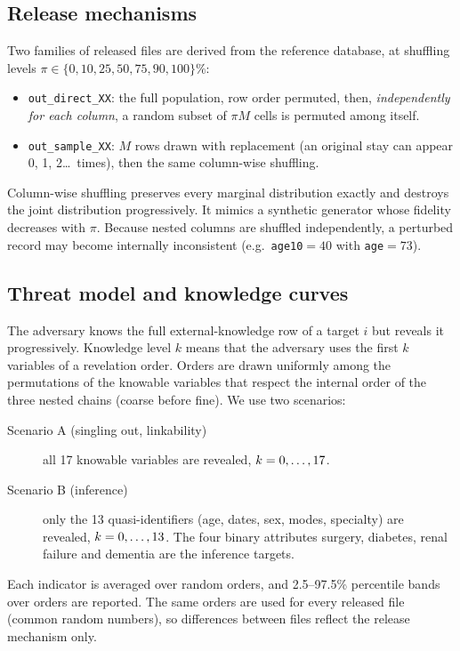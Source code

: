 \documentclass[preprint,12pt]{elsarticle}
\begin{document}
\subsection{Release mechanisms}
Two families of released files are derived from the reference database, at shuffling levels $\pi \in \{0,10,25,50,75,90,100\}\%$:
\begin{itemize}
\item \texttt{out\_direct\_XX}: the full population, row order permuted, then, \emph{independently for each column}, a random subset of $\pi M$ cells is permuted among itself.
\item \texttt{out\_sample\_XX}: $M$ rows drawn with replacement (an original stay can appear 0, 1, 2\dots\ times), then the same column-wise shuffling.
\end{itemize}
Column-wise shuffling preserves every marginal distribution exactly and destroys the joint distribution progressively. It mimics a synthetic generator whose fidelity decreases with $\pi$. Because nested columns are shuffled independently, a perturbed record may become internally inconsistent (e.g.\ \texttt{age10}$=40$ with \texttt{age}$=73$).

\subsection{Threat model and knowledge curves}
\label{sec:threat}
The adversary knows the full external-knowledge row of a target $i$ but reveals it progressively. Knowledge level $k$ means that the adversary uses the first $k$ variables of a revelation order. Orders are drawn uniformly among the permutations of the knowable variables that respect the internal order of the three nested chains (coarse before fine). We use two scenarios:
\begin{description}
\item[Scenario A (singling out, linkability)] all 17 knowable variables are revealed, $k=0,\dots,17$.
\item[Scenario B (inference)] only the 13 quasi-identifiers (age, dates, sex, modes, specialty) are revealed, $k=0,\dots,13$. The four binary attributes surgery, diabetes, renal failure and dementia are the inference targets.
\end{description}
Each indicator is averaged over \Norders{} random orders, and 2.5--97.5\% percentile bands over orders are reported. The same orders are used for every released file (common random numbers), so differences between files reflect the release mechanism only.
\end{document}
